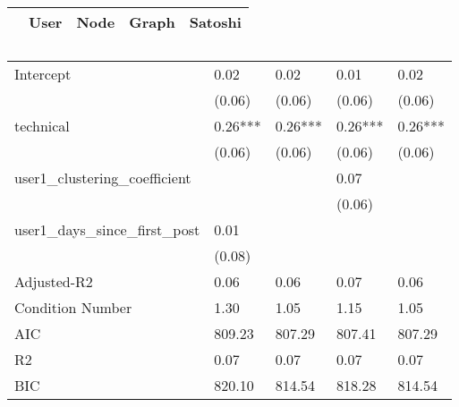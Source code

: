 \begin{table}
\caption{}
\begin{center}
\begin{tabular}{lcccc}
\hline
                             &   User  &   Node  &  Graph  & Satoshi  \\
\hline
\hline
\end{tabular}
\begin{tabular}{lllll}
Intercept                    & 0.02    & 0.02    & 0.01    & 0.02     \\
                             & (0.06)  & (0.06)  & (0.06)  & (0.06)   \\
technical                    & 0.26*** & 0.26*** & 0.26*** & 0.26***  \\
                             & (0.06)  & (0.06)  & (0.06)  & (0.06)   \\
user1_clustering_coefficient &         &         & 0.07    &          \\
                             &         &         & (0.06)  &          \\
user1_days_since_first_post  & 0.01    &         &         &          \\
                             & (0.08)  &         &         &          \\
Adjusted-R2                  & 0.06    & 0.06    & 0.07    & 0.06     \\
Condition Number             & 1.30    & 1.05    & 1.15    & 1.05     \\
AIC                          & 809.23  & 807.29  & 807.41  & 807.29   \\
R2                           & 0.07    & 0.07    & 0.07    & 0.07     \\
BIC                          & 820.10  & 814.54  & 818.28  & 814.54   \\
\hline
\end{tabular}
\end{center}
\end{table}